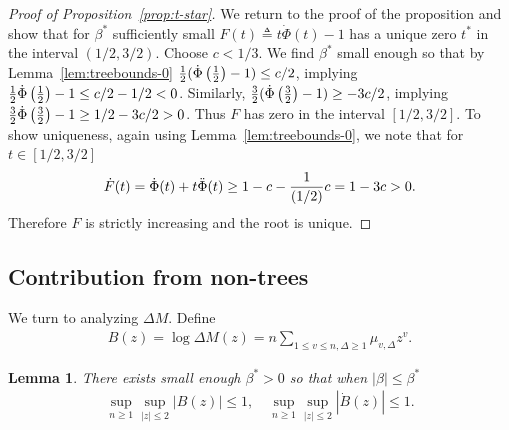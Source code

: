 \documentclass[12pt]{article}
\newtheorem{lemma}[theorem]{Lemma}
\begin{document}
\begin{proof}[Proof of Proposition~\ref{prop:t-star}]
We return to the proof of the proposition
and show that for $\beta^*$ sufficiently small $F(t) \triangleq t \dot\Phi(t) - 1$ has a unique zero $t^*$ in the interval $(1/2, 3/2)$. 
Choose $c<1/3$. We find $\beta^*$ small enough so that by Lemma~\ref{lem:treebounds-0}
${1\over 2}(\dot\Phi\left({1\over 2}\right)-1)\le c/2$, implying ${1\over 2}\dot\Phi\left({1\over 2}\right)-1\le c/2-1/2<0$.
Similarly, ${3\over 2}(\dot\Phi\left({3\over 2}\right)-1)\ge -3c/2$, implying ${3\over 2}\dot\Phi\left({3\over 2}\right)-1\ge 1/2-3c/2>0$.
Thus $F$ has zero in the interval $[1/2,3/2]$. To show uniqueness, again using Lemma~\ref{lem:treebounds-0}, we note that for $t\in [1/2,3/2]$
\begin{align*}
\dot F(t)=\dot \Phi(t)+t\ddot \Phi(t) \ge 1-c-{1\over (1/2)}c=1-3c>0.
\end{align*}
Therefore $F$ is strictly increasing and the root is unique.
\end{proof}



\subsection{Contribution from non-trees}
We turn to analyzing $\Delta M$. Define 
\begin{align*}
B(z)=\log \Delta M(z)=n \sum_{1\le v\le n,\Delta\ge 1}\mu_{v,\Delta}z^{v}.
\end{align*} 


\begin{lemma}\label{lem:nontrees-0}
There exists small enough $\beta^*>0$  so that when $|\beta|\le \beta^*$ 
	\begin{align}
		\sup_{n \geq 1} \sup_{|z| \leq 2} |B(z)| \leq 1, \quad \sup_{n \geq 1} \sup_{|z| \leq 2} |\dot B(z)| \leq 1. \label{eq:B-dot-B}
	\end{align}
\end{lemma}
\end{document}
